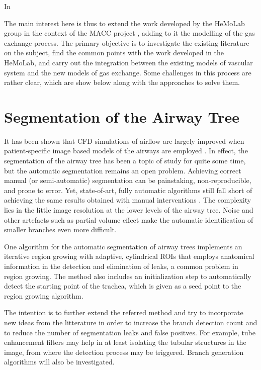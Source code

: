 In \citep{TawhaiM2011}

The main interest here is thus to extend the work developed by the HeMoLab group in the context of the MACC project \citep{Blanco2012,Blanco2010,Blanco2009a,Blanco2007,Golbert2012,Malossi2011,Urquiza2006}, adding to it the modelling of the gas exchange process. The primary objective is to investigate the existing literature on the subject, find the common points with the work developed in the HeMoLab, and carry out the integration between the existing models of vascular system and the new models of gas exchange. Some challenges in this process are rather clear, which are show below along with the approaches to solve them. 

\section{Segmentation of the Airway Tree}

\challenge

It has been shown that CFD simulations of airflow are largely improved when patient-specific image based models of the airways are employed \citep{Tawhai2010,Vial2005}. In effect, the segmentation of the airway tree has been a topic of study for quite some time, but the automatic segmentation remains an open problem. Achieving correct manual (or semi-automatic) segmentation can be painstaking, non-reproducible, and prone to error. Yet, state-of-art, fully automatic algorithms still fall short of achieving the same results obtained with manual interventions \citep{Lo}. The complexity lies in the little image resolution at the lower levels of the airway tree. Noise and other artefacts such as partial volume effect make the automatic identification of smaller branches even more difficult.

\approach

One algorithm for the automatic segmentation of airway trees \citep{Pinho:Airways2} implements an iterative region growing with adaptive, cylindrical ROIs that employs anatomical information in the detection and elimination of leaks, a common problem in region growing. The method also includes an initialization step to automatically detect the starting point of the trachea, which is given as a seed point to the region growing algorithm. 

The intention is to further extend the referred method and try to incorporate new ideas from the litterature \citep{Lo} in order to increase the branch detection count and to reduce the number of segmentation leaks and false positves. For example, tube enhancement filters \citep{ORLO-09} may help in at least isolating the tubular structures in the image, from where the detection process may be triggered. Branch generation algorithms \citep{Tawhai2000} will also be investigated.

